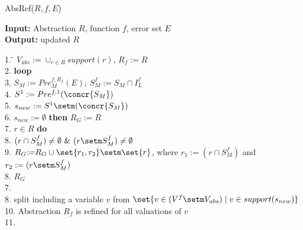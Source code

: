 \documentclass{llncs}
\begin{document}
\begin{algorithm}[htb]
\caption{AbsRef($R,f,E$)} \label{absref}
{\bf Input:} Abstraction $R$, function $f$, error set $E$ \\
 {\bf Output:} updated $R$
 \vspace*{-1ex}
\begin{tabbing}
1.  \= $V_{abs} := \cup_{r \in R} support(r)$, $R_f {:=} R $\\
2. \>  {\bf loop}\\
3. \>  \quad $S_M := Pre^{f,R_f}_M (E)$; $S^f_M := S_M \cap I^f_L$\\
4. \>  \quad $S^1 := Pre^{f,1}(\concr{S_M})$\\
5. \>  \quad $s_{new} := S^1 \setm (\concr{S_M})$ \\
6. \>   $s_{new} := \emptyset$ {\bf then} $R_{G} { := } R $\\ 
7. \> \quad {} $r \in R$ {\bf do}\\
8. \> \quad \quad {} $(r \cap S^f_M) \neq \emptyset\ \&\ (r \setm S^f_M) \neq \emptyset$ \\
9.  \> \quad \quad \quad \quad $R_G {:=} R_G \cup \set{r_1,r_2} \setm \set{r}$, where $r_1 := (r \cap S^f_M)$ and $r_2 :=  (r \setm S^f_M)$\\
8. \>  $R_G$\\
7. \>  \\ 
8. \>  \quad \quad split including a variable $v$ from $\set{ v \in (V^f \setm V_{abs}) \mid v \in support(s_{new})}$\\
10. \> \quad \quad Abstraction $R_f$ is refined for all valuations of  $v$ \\
11. \> \\             
\end{tabbing}
\vspace*{-2ex}
\end{algorithm}
\end{document}
